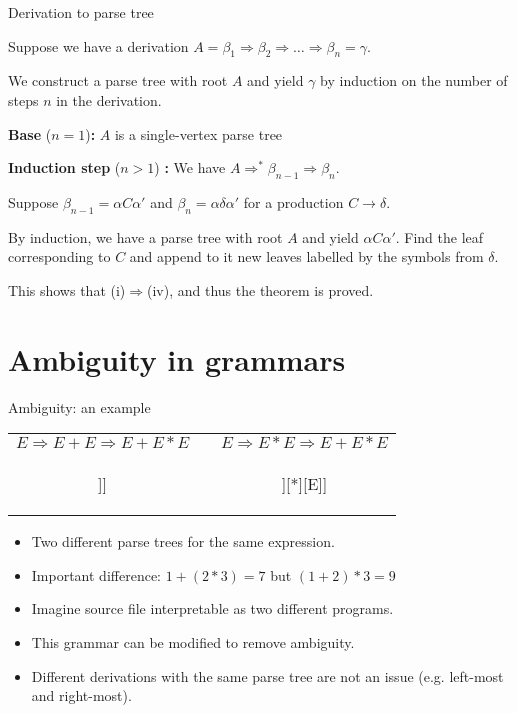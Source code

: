 \documentclass[handout]{beamer}
\begin{document}
\begin{frame}{Derivation to parse tree}

	Suppose we have a derivation $A=\beta_1\Rightarrow\beta_2\Rightarrow\dots\Rightarrow\beta_n=\gamma$. 
	
	We construct a parse tree with root $A$ and yield $\gamma$ by induction on the number of steps $n$ in the derivation.

	\textbf{Base} ($n=1$)\textbf{:} $A$ is a single-vertex parse tree

	\textbf{Induction step} ($n>1$) \textbf{:} We have $A\Rightarrow^*\beta_{n-1}\Rightarrow\beta_n$. 
	
	Suppose $\beta_{n-1}=\alpha C\alpha'$ and $\beta_n=\alpha\delta\alpha'$ for a production $C\to\delta$.


	By induction, we have a parse tree with root $A$ and yield $\alpha C\alpha'$. Find the leaf corresponding to $C$ and append to it new leaves labelled by the symbols from $\delta$.
	
	\bigskip

	This shows that (i)$\Rightarrow$(iv), and thus the theorem is proved. \hfill\qedsymbol
	
\end{frame}


\section*{Ambiguity in grammars}


\begin{frame}{Ambiguity: an example}	

	\bigskip
	\begin{tabular}{c c c}
		$E\Rightarrow E+E\Rightarrow E+E*E$ & \hspace{1em} &
		$E\Rightarrow E*E\Rightarrow E+E*E$ \\
		\begin{forest} 
		[E [E][+][E[E][*][E]]]
		\end{forest}
		& &
		\begin{forest} 
		[E[E[E][+][E]][*][E]]
		\end{forest}
	\end{tabular}
	\begin{itemize}
		\item \alert{Two different parse trees for the same expression.}
		\item Important difference: $1+(2*3)=7 $ but $(1+2)*3=9$
		\item Imagine source file interpretable as two different programs.
		\item This grammar can be modified to remove ambiguity.
		\item Different derivations with the same parse tree are not an issue (e.g. left-most and right-most).
	\end{itemize}

\end{frame}
\end{document}
